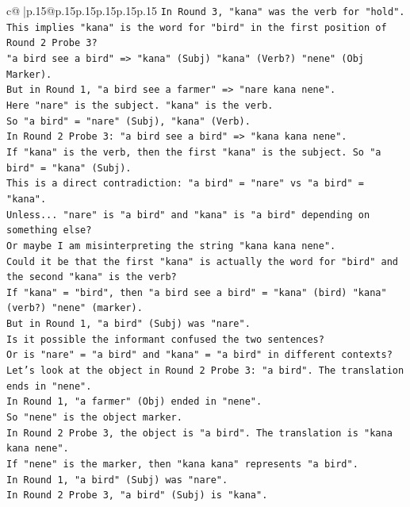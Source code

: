 \documentclass{article}
\begin{document}
{\begin{supertabular}{c@{$\;$}|p{.15\linewidth}@{}p{.15\linewidth}p{.15\linewidth}p{.15\linewidth}p{.15\linewidth}p{.15\linewidth}}
{{{\texttt{In Round 3, "kana" was the verb for "hold".} \\
\texttt{This implies "kana" is the word for "bird" in the first position of Round 2 Probe 3?} \\
\texttt{"a bird see a bird" => "kana" (Subj) "kana" (Verb?) "nene" (Obj Marker).} \\
\texttt{But in Round 1, "a bird see a farmer" => "nare kana nene".} \\
\texttt{Here "nare" is the subject. "kana" is the verb.} \\
\texttt{So "a bird" = "nare" (Subj), "kana" (Verb).} \\
\texttt{In Round 2 Probe 3: "a bird see a bird" => "kana kana nene".} \\
\texttt{If "kana" is the verb, then the first "kana" is the subject. So "a bird" = "kana" (Subj).} \\
\texttt{This is a direct contradiction: "a bird" = "nare" vs "a bird" = "kana".} \\
\texttt{Unless... "nare" is "a bird" and "kana" is "a bird" depending on something else?} \\
\texttt{Or maybe I am misinterpreting the string "kana kana nene".} \\
\texttt{Could it be that the first "kana" is actually the word for "bird" and the second "kana" is the verb?} \\
\texttt{If "kana" = "bird", then "a bird see a bird" = "kana" (bird) "kana" (verb?) "nene" (marker).} \\
\texttt{But in Round 1, "a bird" (Subj) was "nare".} \\
\texttt{Is it possible the informant confused the two sentences?} \\
\texttt{Or is "nare" = "a bird" and "kana" = "a bird" in different contexts?} \\
\texttt{Let's look at the object in Round 2 Probe 3: "a bird". The translation ends in "nene".} \\
\texttt{In Round 1, "a farmer" (Obj) ended in "nene".} \\
\texttt{So "nene" is the object marker.} \\
\texttt{In Round 2 Probe 3, the object is "a bird". The translation is "kana kana nene".} \\
\texttt{If "nene" is the marker, then "kana kana" represents "a bird".} \\
\texttt{In Round 1, "a bird" (Subj) was "nare".} \\
\texttt{In Round 2 Probe 3, "a bird" (Subj) is "kana".} \\
}}}
\end{supertabular}}
\end{document}
